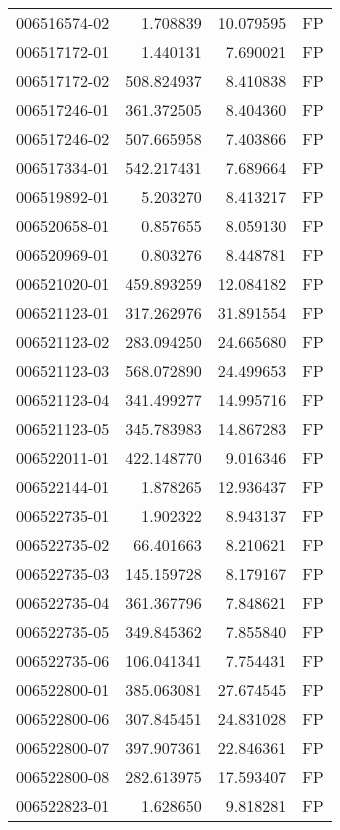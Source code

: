 \begin{tabular}{lrrl}
006516574-02 &    1.708839 &      10.079595 &   FP \\
006517172-01 &    1.440131 &       7.690021 &   FP \\
006517172-02 &  508.824937 &       8.410838 &   FP \\
006517246-01 &  361.372505 &       8.404360 &   FP \\
006517246-02 &  507.665958 &       7.403866 &   FP \\
006517334-01 &  542.217431 &       7.689664 &   FP \\
006519892-01 &    5.203270 &       8.413217 &   FP \\
006520658-01 &    0.857655 &       8.059130 &   FP \\
006520969-01 &    0.803276 &       8.448781 &   FP \\
006521020-01 &  459.893259 &      12.084182 &   FP \\
006521123-01 &  317.262976 &      31.891554 &   FP \\
006521123-02 &  283.094250 &      24.665680 &   FP \\
006521123-03 &  568.072890 &      24.499653 &   FP \\
006521123-04 &  341.499277 &      14.995716 &   FP \\
006521123-05 &  345.783983 &      14.867283 &   FP \\
006522011-01 &  422.148770 &       9.016346 &   FP \\
006522144-01 &    1.878265 &      12.936437 &   FP \\
006522735-01 &    1.902322 &       8.943137 &   FP \\
006522735-02 &   66.401663 &       8.210621 &   FP \\
006522735-03 &  145.159728 &       8.179167 &   FP \\
006522735-04 &  361.367796 &       7.848621 &   FP \\
006522735-05 &  349.845362 &       7.855840 &   FP \\
006522735-06 &  106.041341 &       7.754431 &   FP \\
006522800-01 &  385.063081 &      27.674545 &   FP \\
006522800-06 &  307.845451 &      24.831028 &   FP \\
006522800-07 &  397.907361 &      22.846361 &   FP \\
006522800-08 &  282.613975 &      17.593407 &   FP \\
006522823-01 &    1.628650 &       9.818281 &   FP \\

\end{tabular}

